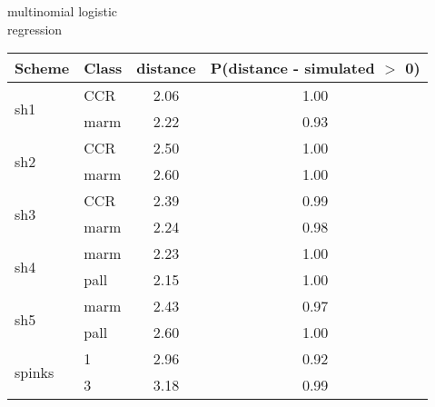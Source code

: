 \begin{subtable}[b]{0.3\textwidth}
  \caption{multinomial logistic\\regression}
  \centering
  \begin{tabular}{ l | l c c }
    \hline
    Scheme & Class & distance & P(distance - simulated \(>\) 0)\\ 
    \hline
    \hline
    \multirow{2}{*}{sh1} & CCR & 2.06 & 1.00 \\ 
    & marm & 2.22 & 0.93 \\ 
    \hline
    \multirow{2}{*}{sh2} & CCR & 2.50 & 1.00 \\ 
    & marm & 2.60 & 1.00 \\ 
    \hline
    \multirow{2}{*}{sh3} & CCR & 2.39 & 0.99 \\ 
    & marm & 2.24 & 0.98 \\ 
    \hline
    \multirow{2}{*}{sh4} & marm & 2.23 & 1.00 \\ 
    & pall & 2.15 & 1.00 \\ 
    \hline
    \multirow{2}{*}{sh5} & marm & 2.43 & 0.97 \\ 
    & pall & 2.60 & 1.00 \\ 
    \hline
    \multirow{2}{*}{spinks} & 1 & 2.96 & 0.92 \\ 
    & 3 & 3.18 & 0.99 \\ 
    \hline
  \end{tabular}
  \label{mmmiss}
\end{subtable}
